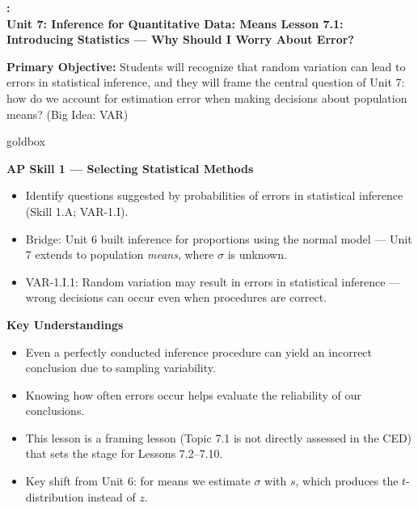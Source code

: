 \documentclass[10pt]{article}
\newcommand{\UnitNumberName}{Unit 7: Inference for Quantitative Data: Means \quad}
\newcommand{\LessonNumberName}{Lesson 7.1: Introducing Statistics --- Why Should I Worry About Error?}
\begin{document}
\begin{center}
    {\Large\bfseries \CourseName: \SchoolYear \\
    {\small\bfseries \UnitNumberName \LessonNumberName}}
\end{center}

\begin{tcolorbox}[colback=sky, colframe=navy, boxrule=0.9pt, arc=2mm,
    left=2mm, right=2mm, top=1.5mm, bottom=1.5mm]
    \textbf{Primary Objective:} Students will recognize that random variation can lead to
    errors in statistical inference, and they will frame the central question of Unit 7:
    how do we account for estimation error when making decisions about population means?
    (Big Idea: VAR)
\end{tcolorbox}

\renewcommand{\arraystretch}{1.6}
\begin{skillbox}{goldbox}
\begin{minipage}[t]{0.48\linewidth}
    \textbf{AP Skill 1 --- Selecting Statistical Methods}
    \begin{itemize}
        \item Identify questions suggested by probabilities of errors in statistical
              inference (Skill 1.A; VAR-1.I).
        \item Bridge: Unit 6 built inference for proportions using the normal model
              --- Unit 7 extends to population \emph{means}, where $\sigma$ is unknown.
        \item VAR-1.I.1: Random variation may result in errors in statistical
              inference --- wrong decisions can occur even when procedures are correct.
    \end{itemize}
\end{minipage}
\hfill
\begin{minipage}[t]{0.48\linewidth}
    \textbf{Key Understandings}
    \begin{itemize}
        \item Even a perfectly conducted inference procedure can yield an incorrect
              conclusion due to sampling variability.
        \item Knowing how often errors occur helps evaluate the reliability of our
              conclusions.
        \item This lesson is a framing lesson (Topic 7.1 is not directly assessed
              in the CED) that sets the stage for Lessons 7.2--7.10.
        \item Key shift from Unit 6: for means we estimate $\sigma$ with $s$,
              which produces the $t$-distribution instead of $z$.
    \end{itemize}
\end{minipage}
\end{skillbox}
\end{document}
